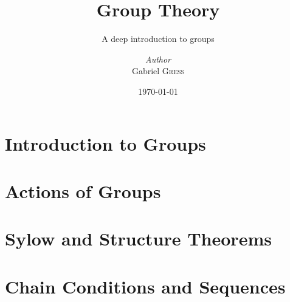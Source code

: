 \documentclass{memoir}
\institute{Rice University}
\title{Group Theory}
\subtitle{A deep introduction to groups}
\author{\textit{Author}\\Gabriel \textsc{Gress}}
\date{\today}
\begin{document}

\maketitle

\tableofcontents

\chapter{Introduction to Groups}
\label{cha:introduction_to_groups}













\chapter{Actions of Groups}
\label{cha:actions_of_groups}





\chapter{Sylow and Structure Theorems}
\label{cha:sylow_and_structure_theorems}




\chapter{Chain Conditions and Sequences}
\label{cha:chain_conditions_and_sequences}





%


\end{document}
